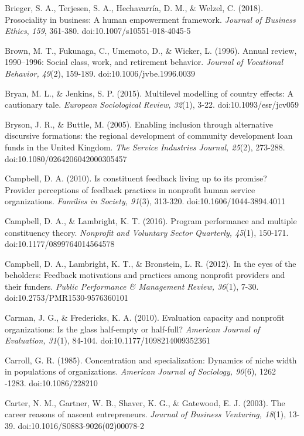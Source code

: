 \documentclass{article}
\begin{document}
Brieger, S. A., Terjesen, S. A., Hechavarría, D. M., \& Welzel, C. (2018). Prosociality in business: A human empowerment framework. \emph{Journal of Business Ethics}, \emph{159}, 361-380. doi:10.1007/s10551-018-4045-5

Brown, M. T., Fukunaga, C., Umemoto, D., \& Wicker, L. (1996). Annual review, 1990--1996: Social class, work, and retirement behavior. \emph{Journal of Vocational }\emph{Behavior}\emph{, 49}(2), 159-189. doi:10.1006/jvbe.1996.0039

Bryan, M. L., \& Jenkins, S. P. (2015). Multilevel modelling of country effects: A cautionary tale. \emph{European Sociological Review, 32}(1), 3-22. doi:10.1093/esr/jcv059

Bryson, J. R., \& Buttle, M. (2005). Enabling inclusion through alternative discursive formations: the regional development of community development loan funds in the United Kingdom. \emph{The Service Industries Journal, 25}(2), 273-288. doi:10.1080/0264206042000305457

Campbell, D. A. (2010). Is constituent feedback living up to its promise? Provider perceptions of feedback practices in nonprofit human service organizations. \emph{Families in Society, 91}(3), 313-320. doi:10.1606/1044-3894.4011

Campbell, D. A., \& Lambright, K. T. (2016). Program performance and multiple constituency theory. \emph{Nonprofit}\emph{ and Voluntary Sector Quarterly, 45}(1), 150-171. doi:10.1177/0899764014564578

Campbell, D. A., Lambright, K. T., \& Bronstein, L. R. (2012). In the eyes of the beholders: Feedback motivations and practices among nonprofit providers and their funders. \emph{Public Performance \& Management Review, 36}(1), 7-30. doi:10.2753/PMR1530-9576360101

Carman, J. G., \& Fredericks, K. A. (2010). Evaluation capacity and nonprofit organizations: Is the glass half-empty or half-full? \emph{American Journal of Evaluation, 31}(1), 84-104. doi:10.1177/1098214009352361

Carroll, G. R. (1985). Concentration and specialization: Dynamics of niche width in populations of organizations. \emph{American Journal of Sociology, 90}(6), 1262 -1283. doi:10.1086/228210

Carter, N. M., Gartner, W. B., Shaver, K. G., \& Gatewood, E. J. (2003). The career reasons of nascent entrepreneurs. \emph{Journal of Business Venturing, 18}(1), 13-39. doi:10.1016/S0883-9026(02)00078-2
\end{document}
